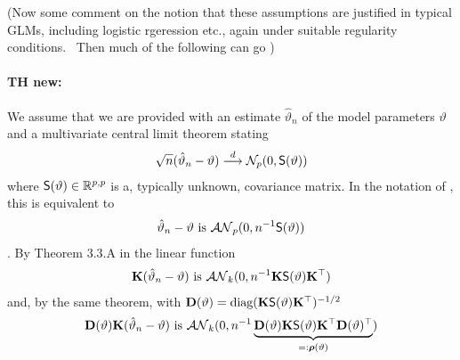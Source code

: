 \documentclass[12pt]{article}
\begin{document}
\bigskip 

(Now some comment on the notion that these assumptions are justified in
typical GLMs, including logistic rgeression etc., again under suitable
regularity conditions. \ Then much of the following can go ) \bigskip 

\bigskip 

\paragraph{TH new:}

We assume that we are provided with an estimate $\hat{\vartheta}_n$ 
of the model parameters
$\vartheta$ and a multivariate central limit theorem stating
\begin{eqnarray} \label{assume}
\sqrt{n} (\hat{\vartheta}_n - \vartheta) \stackrel{d}{\longrightarrow} \mathcal{N}_p(0, \textsf{S}(\vartheta))
\end{eqnarray}
where $\textsf{S}(\vartheta) \in \mathbb{R}^{p,p}$ is a, typically unknown, covariance
matrix.
In the notation of \cite{Serfling1980}, this is equivalent to
\begin{eqnarray*}
\hat{\vartheta}_n - \vartheta \text{ is } \mathcal{AN}_p(0, n^{-1} \textsf{S}(\vartheta))
\end{eqnarray*}
\citep[Section 1.5.5][]{Serfling1980}. By Theorem 3.3.A in
\cite{Serfling1980} the linear function 
\begin{eqnarray*}
\mathbf{K} (\hat{\vartheta}_n - \vartheta) \text{ is } \mathcal{AN}_k(0, n^{-1} \mathbf{K} \textsf{S}(\vartheta) \mathbf{K}^\top)
\end{eqnarray*}
and, by the same theorem, with $\mathbf{D}(\vartheta) = \text{diag}(\mathbf{K} \textsf{S}(\vartheta) \mathbf{K}^\top)^{-1/2}$
\begin{eqnarray} \label{as}
\mathbf{D}(\vartheta) \mathbf{K} (\hat{\vartheta}_n - \vartheta) \text{ is } 
\mathcal{AN}_k(0, n^{-1} \underbrace{\mathbf{D}(\vartheta) \mathbf{K} \textsf{S}(\vartheta) \mathbf{K}^\top
\mathbf{D}(\vartheta)^\top}_{=: \boldsymbol{\rho}(\vartheta)})
\end{eqnarray}
\end{document}
